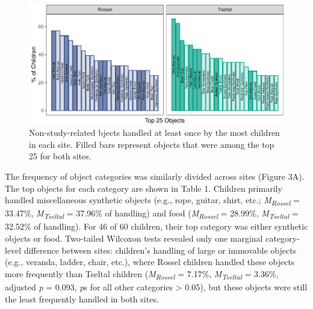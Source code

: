 \documentclass[10pt, letterpaper]{article}
\newenvironment{CodeChunk}{}{}
\begin{document}
\begin{CodeChunk}
\begin{figure}[!ht]

{\centering \includegraphics{figs/top-objects-fig-1} 

}

\caption[Non-study-related bjects handled at least once by the most children in each site]{Non-study-related bjects handled at least once by the most children in each site. Filled bars represent objects that were among the top 25 for both sites.}\label{fig:top-objects-fig}
\end{figure}
\end{CodeChunk}

The frequency of object categories was similarly divided across sites
(Figure 3A). The top objects for each category are shown in Table 1.
Children primarily handled miscellaneous synthetic objects (e.g., rope,
guitar, shirt, etc.; \emph{M}\textsubscript{\emph{Rossel}} = 33.47\%,
\emph{M}\textsubscript{\emph{Tseltal}} = 37.96\% of handling) and food
(\emph{M}\textsubscript{\emph{Rossel}} = 28.99\%,
\emph{M}\textsubscript{\emph{Tseltal}} = 32.52\% of handling). For 46 of
60 children, their top category was either synthetic objects or food.
Two-tailed Wilcoxon tests revealed only one marginal category-level
difference between sites: children's handling of large or immovable
objects (e.g., veranda, ladder, chair, etc.), where Rossel children
handled these objects more frequently than Tseltal children
(\emph{M}\textsubscript{\emph{Rossel}} = 7.17\%,
\emph{M}\textsubscript{\emph{Tseltal}} = 3.36\%, adjusted \emph{p} =
0.093, \emph{p}s for all other categories \textgreater{} 0.05), but
these objects were still the least frequently handled in both sites.
\end{document}
